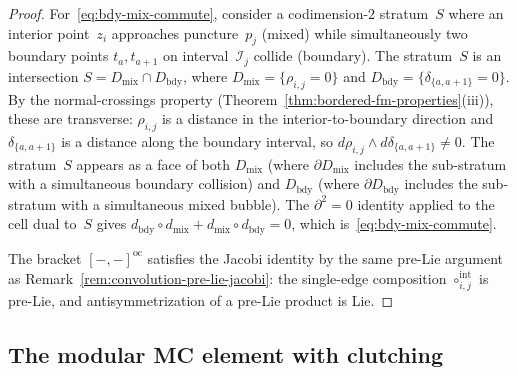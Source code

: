 \begin{proof}
For~\eqref{eq:bdy-mix-commute}, consider a
codimension-$2$ stratum~$S$ where an interior point~$z_i$
approaches puncture~$p_j$ (mixed) while simultaneously two
boundary points $t_a, t_{a+1}$ on interval~$\mathcal{I}_j$
collide (boundary). The stratum~$S$ is an intersection
$S = D_{\mathrm{mix}} \cap D_{\mathrm{bdy}}$, where
$D_{\mathrm{mix}} = \{\rho_{i,j} = 0\}$ and
$D_{\mathrm{bdy}} = \{\delta_{\{a,a+1\}} = 0\}$.
By the normal-crossings property
(Theorem~\ref{thm:bordered-fm-properties}(iii)),
these are transverse:
$\rho_{i,j}$ is a distance in the interior-to-boundary direction
and $\delta_{\{a,a+1\}}$ is a distance along the boundary interval,
so $d\rho_{i,j} \wedge d\delta_{\{a,a+1\}} \neq 0$.
The stratum~$S$ appears as a face of both
$D_{\mathrm{mix}}$ (where $\partial D_{\mathrm{mix}}$ includes the
sub-stratum with a simultaneous boundary collision) and
$D_{\mathrm{bdy}}$ (where $\partial D_{\mathrm{bdy}}$ includes the
sub-stratum with a simultaneous mixed bubble). The
$\partial^2 = 0$ identity applied to the cell dual to~$S$ gives
$d_{\mathrm{bdy}} \circ d_{\mathrm{mix}}
+ d_{\mathrm{mix}} \circ d_{\mathrm{bdy}} = 0$,
which is~\eqref{eq:bdy-mix-commute}.

The bracket $[-,-]^{\mathrm{oc}}$ satisfies the Jacobi identity
by the same pre-Lie argument as
Remark~\ref{rem:convolution-pre-lie-jacobi}: the
single-edge composition $\circ_{i,j}^{\mathrm{int}}$ is pre-Lie,
and antisymmetrization of a pre-Lie product is Lie.
\end{proof}

\subsection{The modular MC element with clutching}
\label{subsec:modular-mc-element-clutching}


